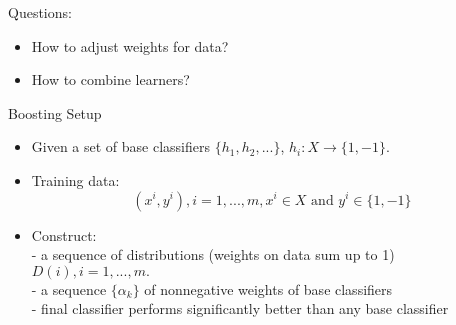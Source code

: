 \documentclass[twoside,12pt]{article}
\begin{document}
Questions: 
\begin{itemize}
\item How to adjust weights for data?
\item How to combine learners? 
\end{itemize}
Boosting Setup
\begin{itemize}
\item Given a set of base classifiers $\{h_1, h_2, ...\}$, $h_i : X \rightarrow \{1, -1\}$.
\item Training data: $$(x^i, y^i), i = 1, ..., m, x^i \in X \text{ and } y^i \in \{1, -1\}$$
\item Construct: \\
- a sequence of distributions (weights on data sum up to 1) $D(i), i = 1, ..., m.$ \\
- a sequence $\{\alpha_k\}$ of nonnegative weights of base classifiers \\
- final classifier performs significantly better than any base classifier \\
\end{itemize}
\end{document}
